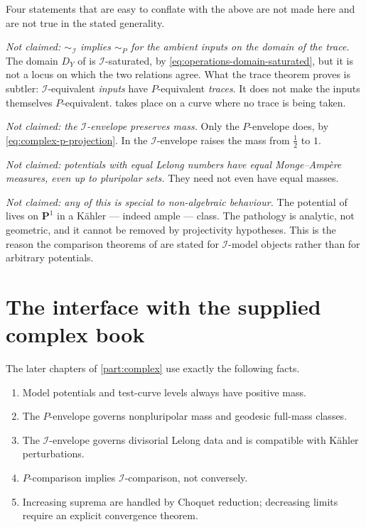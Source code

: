 Four statements that are easy to conflate with the above are not made
here and are not true in the stated generality.

\emph{Not claimed: \(\sim_{\mathcal I}\) implies \(\sim_P\) for the
ambient inputs on the domain of the trace.}  The domain \(D_Y\) of
 is \(\mathcal I\)-saturated, by
\eqref{eq:operations-domain-saturated}, but it is not a locus on which
the two relations agree.  What the trace theorem proves is subtler:
\(\mathcal I\)-equivalent \emph{inputs} have \(P\)-equivalent
\emph{traces}.  It does not make the inputs themselves \(P\)-equivalent.
 takes place on a curve where no trace is being taken.

\emph{Not claimed: the \(\mathcal I\)-envelope preserves mass.}  Only the
\(P\)-envelope does, by \eqref{eq:complex-p-projection}.  In
 the \(\mathcal I\)-envelope raises the mass from
\(\tfrac12\) to \(1\).

\emph{Not claimed: potentials with equal Lelong numbers have equal
Monge--Amp\`ere measures, even up to pluripolar sets.}  They need not even
have equal masses.

\emph{Not claimed: any of this is special to non-algebraic behaviour.}
The potential of  lives on \(\mathbf P^1\) in a
K\"ahler --- indeed ample --- class.  The pathology is analytic, not
geometric, and it cannot be removed by projectivity hypotheses.  This is
the reason the comparison theorems of
 are stated for \(\mathcal I\)-model
objects rather than for arbitrary potentials.

\section{The interface with the supplied complex book}
\label{sec:ch51-interface}

\begin{remark}
\label{chk:complex-interface}
The later chapters of \cref{part:complex} use exactly the following facts.
\begin{enumerate}
\item Model potentials and test-curve levels always have positive mass.
\item The \(P\)-envelope governs nonpluripolar mass and geodesic full-mass
      classes.
\item The \(\mathcal I\)-envelope governs divisorial Lelong data and is
      compatible with K\"ahler perturbations.
\item \(P\)-comparison implies \(\mathcal I\)-comparison, not conversely.
\item Increasing suprema are handled by Choquet reduction; decreasing
      limits require an explicit convergence theorem.
\end{enumerate}
\end{remark}

